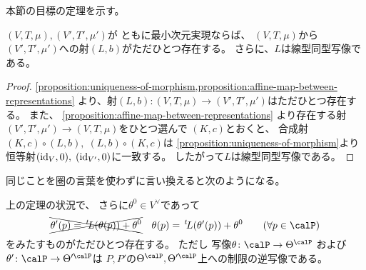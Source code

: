 \documentclass[report]{jlreq}
\begin{document}
本節の目標の定理を示す。

\begin{theorem}[最小次元実現の間のアファイン変換]
    $(V, T, \mu), (V', T', \mu')$が
    ともに最小次元実現ならば、
    $(V, T, \mu)$から$(V', T', \mu')$への射$(L, b)$がただひとつ存在する。
    さらに、$L$は線型同型写像である。
\end{theorem}

\begin{proof}
    \cref{proposition:uniqueness-of-morphism,proposition:affine-map-between-representations}
    より、射$(L, b) \colon (V, T, \mu) \to (V', T', \mu')$はただひとつ存在する。
    また、
    \cref{proposition:affine-map-between-representations}
    より存在する射$(V', T', \mu') \to (V, T, \mu)$をひとつ選んで
    $(K, c)$とおくと、
    合成射$(K, c) \circ (L, b), \; (L, b) \circ (K, c)$は
    \cref{proposition:uniqueness-of-morphism}より
    恒等射$(\mathrm{id}_V, 0), \; (\mathrm{id}_{V'}, 0)$に一致する。
    したがって$L$は線型同型写像である。
\end{proof}

同じことを圏の言葉を使わずに言い換えると次のようになる。


\begin{corollary}[自然パラメータの変換]
    上の定理の状況で、
    さらに$\theta^0 \in V^\vee$であって
    \begin{equation}
        \xcancel{\theta'(p)
            = \up{t}L(\theta(p)) + \theta^0} \quad
        \theta(p)
            = \up{t}L(\theta'(p)) + \theta^0
            \qquad
            (\forall p \in \calP)
            \label{eq:transformation-of-theta}
    \end{equation}
    をみたすものがただひとつ存在する。
    ただし
    写像$\theta \colon \calP \to \Theta^\calP$
    および
    $\theta' \colon \calP \to \Theta'^\calP$は
    $P, P'$の$\Theta^\calP, \Theta'^\calP$上への制限の逆写像である。
\end{corollary}
\end{document}

